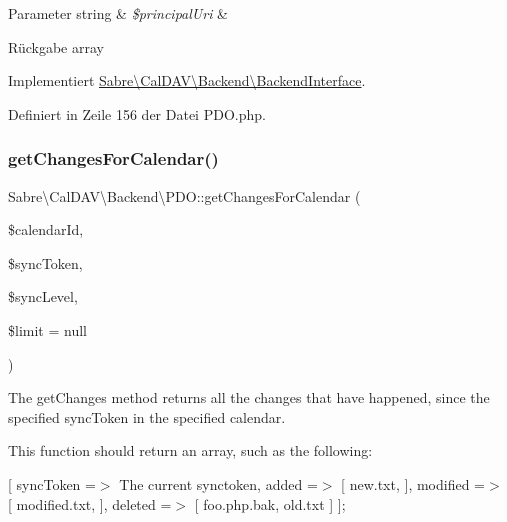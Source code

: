 \begin{DoxyParams}[1]{Parameter}
string & {\em \$principal\+Uri} & \\
\hline
\end{DoxyParams}
\begin{DoxyReturn}{Rückgabe}
array 
\end{DoxyReturn}


Implementiert \mbox{\hyperlink{interface_sabre_1_1_cal_d_a_v_1_1_backend_1_1_backend_interface_a41d069c48af0155b8e6e04bee46c70ba}{Sabre\textbackslash{}\+Cal\+D\+A\+V\textbackslash{}\+Backend\textbackslash{}\+Backend\+Interface}}.



Definiert in Zeile 156 der Datei P\+D\+O.\+php.

\mbox{\label{class_sabre_1_1_cal_d_a_v_1_1_backend_1_1_p_d_o_aed8442b6c016203cfc3cfcb2054938e7}} 
\subsubsection{\texorpdfstring{get\+Changes\+For\+Calendar()}{getChangesForCalendar()}}
{\footnotesize\ttfamily Sabre\textbackslash{}\+Cal\+D\+A\+V\textbackslash{}\+Backend\textbackslash{}\+P\+D\+O\+::get\+Changes\+For\+Calendar (\begin{DoxyParamCaption}\item[{}]{\$calendar\+Id,  }\item[{}]{\$sync\+Token,  }\item[{}]{\$sync\+Level,  }\item[{}]{\$limit = {\ttfamily null} }\end{DoxyParamCaption})}

The get\+Changes method returns all the changes that have happened, since the specified sync\+Token in the specified calendar.

This function should return an array, such as the following\+:

\mbox{[} \textquotesingle{}sync\+Token\textquotesingle{} =$>$ \textquotesingle{}The current synctoken\textquotesingle{}, \textquotesingle{}added\textquotesingle{} =$>$ \mbox{[} \textquotesingle{}new.\+txt\textquotesingle{}, \mbox{]}, \textquotesingle{}modified\textquotesingle{} =$>$ \mbox{[} \textquotesingle{}modified.\+txt\textquotesingle{}, \mbox{]}, \textquotesingle{}deleted\textquotesingle{} =$>$ \mbox{[} \textquotesingle{}foo.\+php.\+bak\textquotesingle{}, \textquotesingle{}old.\+txt\textquotesingle{} \mbox{]} \mbox{]};

